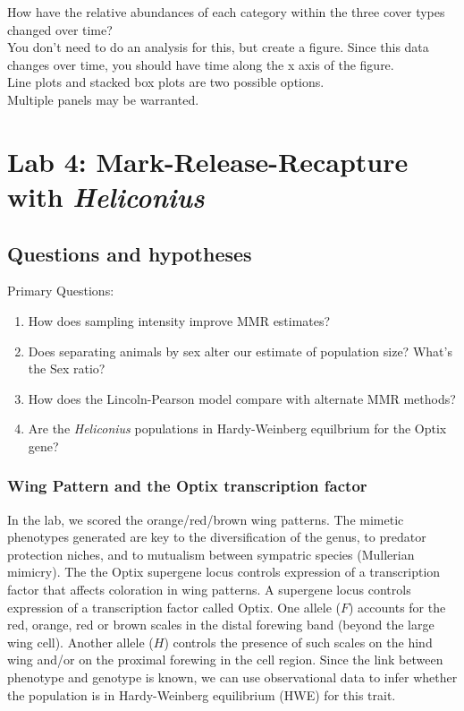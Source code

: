 \documentclass[]{book}
\providecommand{\tightlist}{%
  \setlength{\itemsep}{0pt}\setlength{\parskip}{0pt}}
\begin{document}
How have the relative abundances of each category within the three cover
types changed over time?\\
You don't need to do an analysis for this, but create a figure. Since
this data changes over time, you should have time along the x axis of
the figure.\\
Line plots and stacked box plots are two possible options.\\
Multiple panels may be warranted.

\chapter{\texorpdfstring{Lab 4: Mark-Release-Recapture with
\emph{Heliconius}}{Lab 4: Mark-Release-Recapture with Heliconius}}\label{Lab4}

\section{Questions and hypotheses}\label{questions-and-hypotheses-1}

Primary Questions:

\begin{enumerate}
\def\labelenumi{\arabic{enumi}.}
\tightlist
\item
  How does sampling intensity improve MMR estimates?
\item
  Does separating animals by sex alter our estimate of population size?
  What's the Sex ratio?
\item
  How does the Lincoln-Pearson model compare with alternate MMR methods?
\item
  Are the \emph{Heliconius} populations in Hardy-Weinberg equilbrium for
  the Optix gene?
\end{enumerate}

\subsection{Wing Pattern and the Optix transcription
factor}\label{wing-pattern-and-the-optix-transcription-factor}

In the lab, we scored the orange/red/brown wing patterns. The mimetic
phenotypes generated are key to the diversification of the genus, to
predator protection niches, and to mutualism between sympatric species
(Mullerian mimicry). The the Optix supergene locus controls expression
of a transcription factor that affects coloration in wing patterns. A
supergene locus controls expression of a transcription factor called
Optix. One allele (\(F\)) accounts for the red, orange, red or brown
scales in the distal forewing band (beyond the large wing cell). Another
allele (\(H\)) controls the presence of such scales on the hind wing
and/or on the proximal forewing in the cell region. Since the link
between phenotype and genotype is known, we can use observational data
to infer whether the population is in Hardy-Weinberg equilibrium (HWE)
for this trait.
\end{document}
